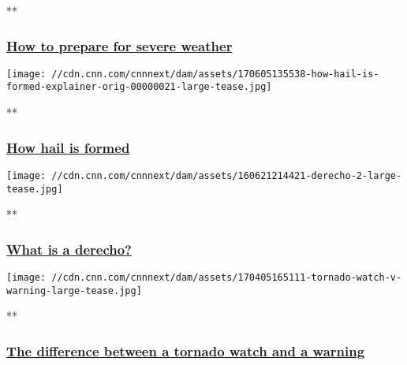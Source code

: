 **

\hypertarget{how-to-prepare-for-severe-weather}{%
\subsubsection{\texorpdfstring{\href{/videos/weather/2019/04/16/how-to-prepare-for-severe-weather-tornado-wx-orig-llr.cnn}{How
to prepare for severe
weather}}{How to prepare for severe weather}}\label{how-to-prepare-for-severe-weather}}

\href{/videos/weather/2017/06/05/how-hail-is-formed-explainer-orig.cnn}{}

\texttt{[image: //cdn.cnn.com/cnnnext/dam/assets/170605135538-how-hail-is-formed-explainer-orig-00000021-large-tease.jpg]}

**

\hypertarget{how-hail-is-formed}{%
\subsubsection{\texorpdfstring{\href{/videos/weather/2017/06/05/how-hail-is-formed-explainer-orig.cnn}{How
hail is formed}}{How hail is formed}}\label{how-hail-is-formed}}

\href{/videos/weather/2016/06/22/what-is-a-derecho-storm-jennifer-gray-mobile-orig-mss.cnn}{}

\texttt{[image: //cdn.cnn.com/cnnnext/dam/assets/160621214421-derecho-2-large-tease.jpg]}

**

\hypertarget{what-is-a-derecho}{%
\subsubsection{\texorpdfstring{\href{/videos/weather/2016/06/22/what-is-a-derecho-storm-jennifer-gray-mobile-orig-mss.cnn}{What
is a derecho?}}{What is a derecho?}}\label{what-is-a-derecho}}

\href{/videos/weather/2017/04/05/what-is-tornado-watch-warning-jpm-orig-mobile.cnn}{}

\texttt{[image: //cdn.cnn.com/cnnnext/dam/assets/170405165111-tornado-watch-v-warning-large-tease.jpg]}

**

\hypertarget{the-difference-between-a-tornado-watch-and-a-warning}{%
\subsubsection{\texorpdfstring{\href{/videos/weather/2017/04/05/what-is-tornado-watch-warning-jpm-orig-mobile.cnn}{The
difference between a tornado watch and a
warning}}{The difference between a tornado watch and a warning}}\label{the-difference-between-a-tornado-watch-and-a-warning}}

